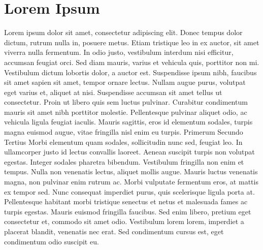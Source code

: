 \section{Lorem Ipsum}\markdownRendererInterblockSeparator
{}Lorem ipsum dolor sit amet, consectetur adipiscing elit. Donec tempus dolor dictum, rutrum nulla in, posuere metus. Etiam tristique leo in ex auctor, sit amet viverra nulla fermentum. In odio justo, vestibulum interdum nisi efficitur, accumsan feugiat orci. Sed diam mauris, varius et vehicula quis, porttitor non mi. Vestibulum dictum lobortis dolor, a auctor est. Suspendisse ipsum nibh, faucibus sit amet sapien sit amet, tempor ornare lectus. Nullam augue purus, volutpat eget varius et, aliquet at nisi. Suspendisse accumsan sit amet tellus ut consectetur. Proin ut libero quis sem luctus pulvinar. Curabitur condimentum mauris sit amet nibh porttitor molestie. Pellentesque pulvinar aliquet odio, ac vehicula ligula feugiat iaculis. Mauris sagittis, eros id elementum sodales, turpis magna euismod augue, vitae fringilla nisl enim eu turpis.\markdownRendererInterblockSeparator
{}\markdownRendererUlBeginTight
\markdownRendererUlItem Primerum\markdownRendererUlItemEnd 
\markdownRendererUlItem Secundo\markdownRendererUlItemEnd 
\markdownRendererUlItem Tertius\markdownRendererUlItemEnd 
\markdownRendererUlEndTight \markdownRendererInterblockSeparator
{}Morbi elementum quam sodales, sollicitudin nunc sed, feugiat leo. In ullamcorper justo id lectus convallis laoreet. Aenean suscipit turpis non volutpat egestas. Integer sodales pharetra bibendum. Vestibulum fringilla non enim et tempus. Nulla non venenatis lectus, aliquet mollis augue. Mauris luctus venenatis magna, non pulvinar enim rutrum ac. Morbi vulputate fermentum eros, at mattis ex tempor sed. Nunc consequat imperdiet purus, quis scelerisque ligula porta at. Pellentesque habitant morbi tristique senectus et netus et malesuada fames ac turpis egestas. Mauris euismod fringilla faucibus. Sed enim libero, pretium eget consectetur et, commodo sit amet odio. Vestibulum lorem lorem, imperdiet a placerat blandit, venenatis nec erat. Sed condimentum cursus est, eget condimentum odio suscipit eu. \relax